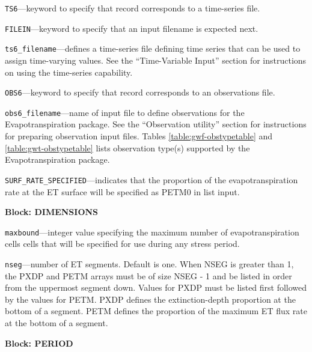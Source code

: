 \begin{description}
\item \texttt{TS6}---keyword to specify that record corresponds to a time-series file.

\item \texttt{FILEIN}---keyword to specify that an input filename is expected next.

\item \texttt{ts6\_filename}---defines a time-series file defining time series that can be used to assign time-varying values. See the ``Time-Variable Input'' section for instructions on using the time-series capability.

\item \texttt{OBS6}---keyword to specify that record corresponds to an observations file.

\item \texttt{obs6\_filename}---name of input file to define observations for the Evapotranspiration package. See the ``Observation utility'' section for instructions for preparing observation input files. Tables \ref{table:gwf-obstypetable} and \ref{table:gwt-obstypetable} lists observation type(s) supported by the Evapotranspiration package.

\item \texttt{SURF\_RATE\_SPECIFIED}---indicates that the proportion of the evapotranspiration rate at the ET surface will be specified as PETM0 in list input.

\end{description}
\item \textbf{Block: DIMENSIONS}

\begin{description}
\item \texttt{maxbound}---integer value specifying the maximum number of evapotranspiration cells cells that will be specified for use during any stress period.

\item \texttt{nseg}---number of ET segments.  Default is one.  When NSEG is greater than 1, the PXDP and PETM arrays must be of size NSEG - 1 and be listed in order from the uppermost segment down. Values for PXDP must be listed first followed by the values for PETM.  PXDP defines the extinction-depth proportion at the bottom of a segment. PETM defines the proportion of the maximum ET flux rate at the bottom of a segment.

\end{description}
\item \textbf{Block: PERIOD}

